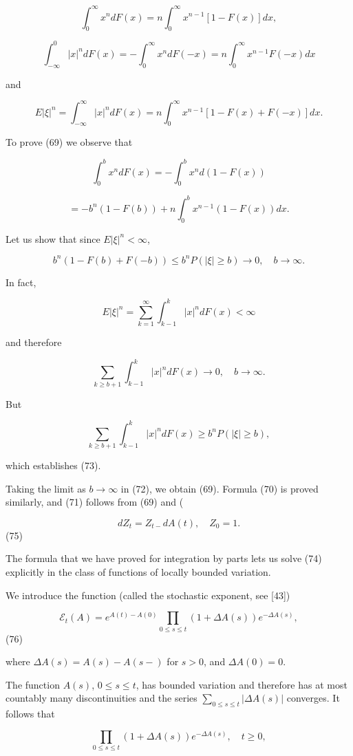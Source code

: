 $$\int_0^\infty x^n dF(x) = n \int_0^\infty x^{n-1}[1 - F(x)] dx,$$

$$\int_{-\infty}^0 |x|^n dF(x) = -\int_0^\infty x^n dF(-x) = n \int_0^\infty x^{n-1}F(-x) dx$$

and

$$E|\xi|^n = \int_{-\infty}^{\infty}|x|^n dF(x) = n \int_0^\infty x^{n-1}[1 - F(x) + F(-x)] dx.$$

To prove (69) we observe that

$$\int_0^b x^n dF(x) = -\int_0^b x^n d(1 - F(x))$$

$$= -b^n(1 - F(b)) + n \int_0^b x^{n-1}(1 - F(x)) dx.$$

Let us show that since $E|\xi|^n < \infty$,

$$b^n(1 - F(b) + F(-b)) \leq b^nP(|\xi| \geq b) \to 0, \quad b \to \infty.$$

In fact,

$$E|\xi|^n = \sum_{k=1}^{\infty} \int_{k-1}^k |x|^n dF(x) < \infty$$

and therefore

$$\sum_{k \geq b+1} \int_{k-1}^k |x|^n dF(x) \to 0, \quad b \to \infty.$$

But

$$\sum_{k \geq b+1} \int_{k-1}^k |x|^n dF(x) \geq b^nP(|\xi| \geq b),$$

which establishes (73).

Taking the limit as $b \to \infty$ in (72), we obtain (69). Formula (70) is proved similarly, and (71) follows from (69) and (

$$dZ_t = Z_{t-} dA(t), \quad Z_0 = 1.$$ (75)

The formula that we have proved for integration by parts lets us solve (74) explicitly in the class of functions of locally bounded variation.

We introduce the function (called the stochastic exponent, see [43])

$$\mathcal{E}_t(A) = e^{A(t)-A(0)} \prod_{0 \leq s \leq t} (1 + \Delta A(s)) e^{-\Delta A(s)},$$ (76)

where $\Delta A(s) = A(s) - A(s-)$ for $s > 0$, and $\Delta A(0) = 0$.

The function $A(s)$, $0 \leq s \leq t$, has bounded variation and therefore has at most countably many discontinuities and the series $\sum_{0 \leq s \leq t} |\Delta A(s)|$ converges. It follows that

$$\prod_{0 \leq s \leq t} (1 + \Delta A(s)) e^{-\Delta A(s)}, \quad t \geq 0,$$


